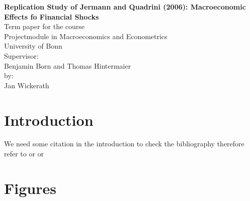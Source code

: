 \documentclass[a4paper,12pt,titlepage]{article}
\begin{document}
\begin{titlepage}
\begin{center}

\textbf{\Huge Replication Study of Jermann and Quadrini (2006): Macroeconomic
  Effects fo Financial Shocks}
\\[5cm]
\Large 
Term paper for the course\\
Projectmodule in Macroeconomics and Econometrics\\
University of Bonn\\
\vfill
Supervisor: \\
Benjamin Born and Thomas Hintermaier\\[2cm]

by:\\
Jan Wickerath\\


\end{center}
\end{titlepage}

\thispagestyle{empty}
\tableofcontents

\newpage

\setcounter{page}{1}

\thispagestyle{empty}

\section{Introduction}
\label{sec:intro}

We need some citation in the introduction to check the bibliography therefore
refer to \cite{Eggertsson_Krugman_QJE2012} or
\textcite{Eggertsson_Krugman_QJE2012} or \parencite{Eggertsson_Krugman_QJE2012}
% 
% 
% 
% 
% 
\newpage

\appendix

\section{Figures}

\newpage
\printbibliography
% 
% 
\end{document}
